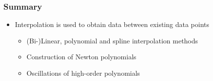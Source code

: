 
\begin{frame}
  \frametitle{Summary}
  \begin{itemize}
    \item Interpolation is used to obtain data between existing data points
    \begin{itemize}
      \item (Bi-)Linear, polynomial and spline interpolation methods
      \item Construction of Newton polynomials
      \item Oscillations of high-order polynomials
    \end{itemize}
  \end{itemize}
\end{frame}